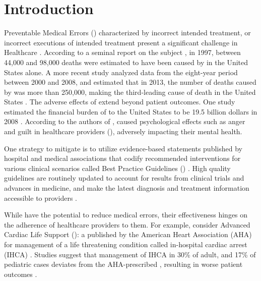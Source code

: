 \section{Introduction}

Preventable Medical Errors (\PMEs{}) characterized by
incorrect intended treatment, or incorrect executions of intended
treatment present a significant challenge in Healthcare
\cite{RodziewiczStatsPearls18}. According to a seminal report on the subject
\cite{DonaldsonBook00}, in 1997,
between 44,000 and 98,000 deaths were estimated to have been caused by \PMEs{} in
the United States alone. A more recent study analyzed data from the eight-year
period between 2000 and 2008, and estimated that in 2013, the number of deaths
caused by \PMEs{} was more than 250,000, making \PMEs{} the third-leading
cause of death in the United States \cite{MakaryBMJ16}.
The adverse effects of \PMEs{} extend beyond patient outcomes.
One study estimated the financial burden of \PMEs{} to the United States to be
19.5 billion dollars in 2008 \cite{AndelJHCF12}. According to the authors of
\cite{RodziewiczStatsPearls18}, \PMEs{} caused psychological effects such
as anger and guilt in healthcare providers (\HCPs{}), adversely impacting their mental
health.

One strategy to mitigate \PMEs{} is to utilize evidence-based statements
published by hospital and medical associations that codify recommended
interventions for various clinical scenarios called Best Practice Guidelines (\BPGs{})
\cite{field1990clinical}. High quality guidelines are routinely updated to account for
 results from clinical trials and advances in medicine, and make the latest
 diagnosis and treatment information accessible to providers \cite{SteinbergNAP11}.

While \BPGs{} have the potential to reduce medical errors, their effectiveness hinges
on the adherence of healthcare providers to them.
For example, consider Advanced Cardiac Life Support (\ACLS{}): a \BPG{} published
by the American Heart Association (AHA) for management
of a life threatening condition called in-hospital cardiac arrest (IHCA) \cite{AHAGuidelineAdult, AHAGuidelinePed}. Studies suggest that management
of IHCA in 30\% of adult, and 17\% of pediatric cases deviates from the
AHA-prescribed \BPG, resulting in worse patient outcomes \cite{Ornato2012DeviationAdult,Wolfe2020DeviationPediatric,
Crowley2020DeviationAdult,Honarmand2018Adherence,Mcevoy2014Adherence}.

